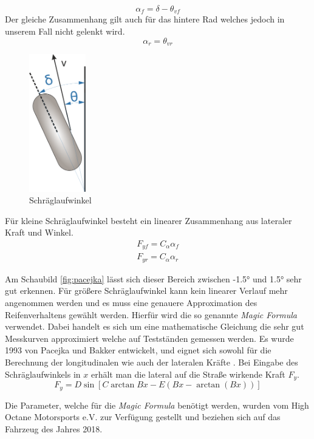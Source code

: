 \documentclass{like}
\begin{document}
\begin{equation}
\alpha_f = \delta - \theta_{vf}
\end{equation}
Der gleiche Zusammenhang gilt auch für das hintere Rad welches jedoch in unserem Fall nicht gelenkt wird.
\begin{equation}
\alpha_r = \theta_{vr}
\end{equation}


\begin{figure}[ht!]
	\centering
	\includegraphics[width=70pt]{Abbildungen/slipAngle.png}
	\caption{Schräglaufwinkel}
	\label{fig:linLat}
\end{figure}


Für kleine Schräglaufwinkel besteht ein linearer Zusammenhang aus lateraler Kraft und Winkel. 
\begin{eqnarray}
F_{yf} = C_\alpha \alpha_f \\
F_{yr} = C_\alpha \alpha_r
\end{eqnarray}

Am Schaubild \ref{fig:pacejka} lässt sich dieser Bereich zwischen -1.5° und 1.5° sehr gut erkennen. Für größere Schräglaufwinkel kann kein linearer Verlauf mehr angenommen werden und es muss eine genauere Approximation des Reifenverhaltens gewählt werden. Hierfür wird die so genannte \textit{Magic Formula}  \cite{magicFormula} verwendet. Dabei handelt es sich um eine mathematische Gleichung die sehr gut Messkurven approximiert welche auf Testständen gemessen werden.
Es wurde 1993 von Pacejka und Bakker entwickelt, und eignet sich sowohl für die Berechnung der longitudinalen wie auch der lateralen Kräfte . Bei Eingabe des Schräglaufwinkels in \(x\) erhält man die lateral auf die Straße wirkende Kraft \(F_y\). 
\begin{equation}
F_y = D\sin[C\arctan{Bx - E(Bx - \arctan(Bx))}]
\label{eq:magicF}
\end{equation}

Die Parameter, welche für die \textit{Magic Formula} benötigt werden, wurden vom High Octane Motorsports e.V. zur Verfügung gestellt und beziehen sich auf das Fahrzeug des Jahres 2018.
\end{document}
